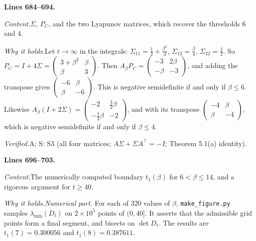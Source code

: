 \documentclass[11pt]{amsart}
\newcommand{\tp}{\top}
\newcommand{\src}[1]{\par\bigskip\noindent\textbf{Lines #1.}\enspace}
\newcommand{\content}{\par\smallskip\noindent\textit{Content.}\enspace}
\newcommand{\why}{\par\smallskip\noindent\textit{Why it holds.}\enspace}
\newcommand{\verified}{\par\smallskip\noindent\textit{Verified.}\enspace}
\newcommand{\tA}{\textsf{A}}
\newcommand{\tS}{\textsf{S}}
\newcommand{\file}[1]{\texttt{#1}}
\begin{document}
\src{684--694}
\content $\Sigma$, $P_C$, and the two Lyapunov matrices, which recover the thresholds $6$ and $4$.
\why Let $t\to\infty$ in the integrals: $\Sigma_{11}=\frac12+\frac{\beta^2}4$, $\Sigma_{12}=\frac\beta4$,
$\Sigma_{22}=\frac12$. So $P_C=I+4\Sigma=\begin{pmatrix}3+\beta^2&\beta\\\beta&3\end{pmatrix}$. Then
$A_\beta P_C=\begin{pmatrix}-3&2\beta\\-\beta&-3\end{pmatrix}$, and adding the transpose gives
$\begin{pmatrix}-6&\beta\\\beta&-6\end{pmatrix}$. This is negative semidefinite if and only if $\beta\le6$. Likewise
$A_\beta(I+2\Sigma)=\begin{pmatrix}-2&\frac32\beta\\-\frac12\beta&-2\end{pmatrix}$, and with its transpose
$\begin{pmatrix}-4&\beta\\\beta&-4\end{pmatrix}$, which is negative semidefinite if and only if $\beta\le4$.
\verified \tA; \tS: S3 (all four matrices; $A\Sigma+\Sigma A^\tp=-I$; Theorem 5.1(a) identity).

\src{696--703}
\content The numerically computed boundary $t_1(\beta)$ for $6<\beta\le14$, and a rigorous argument for $t\ge40$.
\why \emph{Numerical part.} For each of 320 values of $\beta$, \file{make\_figure.py} samples $\lambda_{\min}(D_t)$ on
$2\times10^5$ points of $(0,40]$. It asserts that the admissible grid points form a final segment, and bisects on
$\det D_t$. The results are $t_1(7)=0.300056$ and $t_1(8)=0.387611$.
\end{document}
